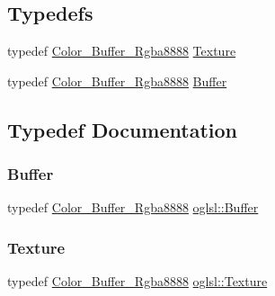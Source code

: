 \subsection*{Typedefs}
\begin{DoxyCompactItemize}
\item 
typedef \mbox{\hyperlink{classoglsl_1_1_color___buffer___rgba8888}{Color\+\_\+\+Buffer\+\_\+\+Rgba8888}} \mbox{\hyperlink{namespaceoglsl_a3f3bf2d9553fda1a155d7492ee30d7d0}{Texture}}
\item 
typedef \mbox{\hyperlink{classoglsl_1_1_color___buffer___rgba8888}{Color\+\_\+\+Buffer\+\_\+\+Rgba8888}} \mbox{\hyperlink{namespaceoglsl_a54a481d3b94c4faefeb16560e4b85a34}{Buffer}}
\end{DoxyCompactItemize}


\subsection{Typedef Documentation}
\mbox{\label{namespaceoglsl_a54a481d3b94c4faefeb16560e4b85a34}} 
\subsubsection{\texorpdfstring{Buffer}{Buffer}}
{\footnotesize\ttfamily typedef \mbox{\hyperlink{classoglsl_1_1_color___buffer___rgba8888}{Color\+\_\+\+Buffer\+\_\+\+Rgba8888}} \mbox{\hyperlink{namespaceoglsl_a54a481d3b94c4faefeb16560e4b85a34}{oglsl\+::\+Buffer}}}

\mbox{\label{namespaceoglsl_a3f3bf2d9553fda1a155d7492ee30d7d0}} 
\subsubsection{\texorpdfstring{Texture}{Texture}}
{\footnotesize\ttfamily typedef \mbox{\hyperlink{classoglsl_1_1_color___buffer___rgba8888}{Color\+\_\+\+Buffer\+\_\+\+Rgba8888}} \mbox{\hyperlink{namespaceoglsl_a3f3bf2d9553fda1a155d7492ee30d7d0}{oglsl\+::\+Texture}}}

